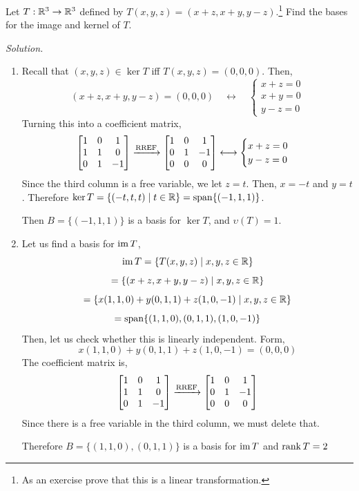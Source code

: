 \newpage
\begin{example}
Let $T: \mathbb{R}^3 \to \mathbb{R}^3$ defined by $T(x, y, z) = (x + z, x + y, y - z)$.\footnote{As an exercise prove that this is a linear transformation.} Find the bases for the image and kernel of $T$.

\textit{Solution.}

\begin{enumerate}[label=(\alph*)]
    \item Recall that $(x, y, z) \in \ker T$ iff $T(x, y, z) = (0, 0, 0)$. Then,
    $$(x + z, x + y, y - z) = (0, 0, 0) \quad \longleftrightarrow \quad \begin{cases}
        x + z = 0 \\
        x + y = 0 \\
        y - z = 0
    \end{cases}$$
    Turning this into a coefficient matrix,
    $$\begin{bmatrix} 1 & 0 & 1 \\ 1 & 1 & 0 \\ 0 & 1 & -1 \end{bmatrix} \xrightarrow{\text{RREF}} \begin{bmatrix} 1 & 0 & 1 \\ 0 & 1 & -1 \\ 0 & 0 & 0 \end{bmatrix} \longleftrightarrow \begin{cases}
        x + z = 0 \\
        y - z = 0
    \end{cases}$$
    Since the third column is a free variable, we let $z = t$. Then, $x = -t$ and $y = t$. Therefore $\ker T = \{(-t, t, t) \mid t \in \mathbb{R}\} = \operatorname{span}\{(-1, 1, 1)\}$. 
    
    Then $B = \{(-1, 1, 1)\}$ is a basis for $\ker T$, and $\upsilon(T) = 1$.

    \item Let us find a basis for $\operatorname{im} T$,
    $$\operatorname{im} T = \{T(x, y, z) \mid x, y, z \in \mathbb{R}\}$$
    $$=\{(x + z, x + y, y - z) \mid x, y, z \in \mathbb{R}\}$$
    $$=\{x(1, 1, 0) + y(0, 1, 1) + z(1, 0, -1) \mid x, y, z \in \mathbb{R}\}$$
    $$=\operatorname{span}\{(1, 1, 0), (0, 1, 1), (1, 0, -1)\}$$
    Then, let us check whether this is linearly independent. Form,
    $$x(1, 1, 0) + y(0, 1, 1) + z(1, 0, -1) = (0, 0, 0)$$
    The coefficient matrix is,
    $$\begin{bmatrix} 1 & 0 & 1 \\ 1 & 1 & 0 \\ 0 & 1 & -1 \end{bmatrix} \xrightarrow{\text{RREF}} \begin{bmatrix} 1 & 0 & 1 \\ 0 & 1 & -1 \\ 0 & 0 & 0 \end{bmatrix}$$
    Since there is a free variable in the third column, we must delete that. 
    
    Therefore $B = \{(1, 1, 0), (0, 1, 1)\}$ is a basis for $\operatorname{im} T$ and $\rank T = 2$
\end{enumerate}
\end{example}

